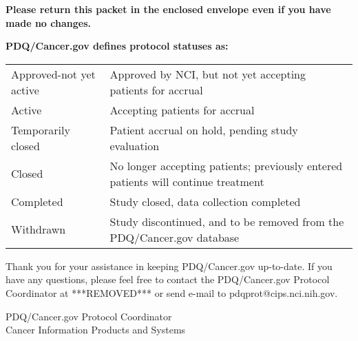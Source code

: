 \documentclass[letterpaper,12pt]{letter}
\begin{document}
\textbf{Please return this packet in the enclosed envelope even if you have
    made no changes.}

\textbf{PDQ/Cancer.gov defines protocol statuses as:}

\begin{longtable}{p{2in}p{4in}}
Approved-not yet active & Approved by NCI, but not yet accepting
                          patients for accrual \\
Active                  & Accepting patients for accrual \\
Temporarily closed      & Patient accrual on hold, pending study evaluation \\
Closed                  & No longer accepting patients; previously entered
                          patients will continue treatment \\
Completed               & Study closed, data collection completed \\
Withdrawn               & Study discontinued, and to be removed from
                          the PDQ/Cancer.gov database
\end{longtable}

Thank you for your assistance in keeping PDQ/Cancer.gov up-to-date.  If you
have any questions, please feel free to contact the PDQ/Cancer.gov Protocol
Coordinator at ***REMOVED*** or send e-mail to pdqprot@cips.nci.nih.gov.

\vspace{12pt}

PDQ/Cancer.gov Protocol Coordinator \\
Cancer Information Products and Systems

\vfill
\end{document}
